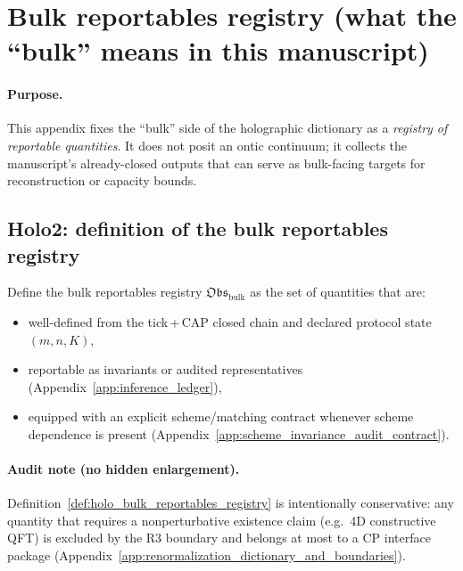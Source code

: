 \section{Bulk reportables registry (what the ``bulk'' means in this manuscript)}
\label{app:holo_bulk_observables_registry}

\paragraph{Purpose.}
\AuditTag This appendix fixes the ``bulk'' side of the holographic dictionary as a \emph{registry of reportable quantities}.
It does not posit an ontic continuum; it collects the manuscript's already-closed outputs that can serve as bulk-facing
targets for reconstruction or capacity bounds.

\subsection{Holo2: definition of the bulk reportables registry}
\label{subsec:holo2_bulk_registry_def}

\begin{definition}
\label{def:holo_bulk_reportables_registry}
\MathTag Define the bulk reportables registry $\mathfrak{Obs}_{\mathrm{bulk}}$ as the set of quantities that are:
\begin{itemize}
\item well-defined from the tick\,+\,CAP closed chain and declared protocol state $(m,n,K)$,
\item reportable as invariants or audited representatives (Appendix~\ref{app:inference_ledger}),
\item equipped with an explicit scheme/matching contract whenever scheme dependence is present
(Appendix~\ref{app:scheme_invariance_audit_contract}).
\end{itemize}
\end{definition}

\paragraph{Audit note (no hidden enlargement).}
\AuditTag Definition~\ref{def:holo_bulk_reportables_registry} is intentionally conservative:
any quantity that requires a nonperturbative existence claim (e.g.\ 4D constructive QFT) is excluded by the R3 boundary
and belongs at most to a CP interface package (Appendix~\ref{app:renormalization_dictionary_and_boundaries}).

